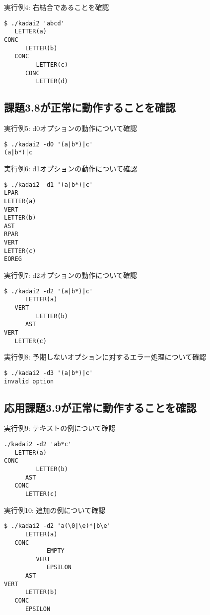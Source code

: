 \documentclass{jsarticle}
\theoremstyle{plain}
\begin{document}
実行例4: 右結合であることを確認
\begin{lstlisting}
$ ./kadai2 'abcd'
   LETTER(a)
CONC
      LETTER(b)
   CONC
         LETTER(c)
      CONC
         LETTER(d)
\end{lstlisting}


\subsection*{課題3.8が正常に動作することを確認}

実行例5: d0オプションの動作について確認
\begin{lstlisting}
$ ./kadai2 -d0 '(a|b*)|c'
(a|b*)|c
\end{lstlisting}

実行例6: d1オプションの動作について確認
\begin{lstlisting}
$ ./kadai2 -d1 '(a|b*)|c'
LPAR
LETTER(a)
VERT
LETTER(b)
AST
RPAR
VERT
LETTER(c)
EOREG
\end{lstlisting}

実行例7: d2オプションの動作について確認
\begin{lstlisting}
$ ./kadai2 -d2 '(a|b*)|c'
      LETTER(a)
   VERT
         LETTER(b)
      AST
VERT
   LETTER(c)
\end{lstlisting}

実行例8: 予期しないオプションに対するエラー処理について確認
\begin{lstlisting}
$ ./kadai2 -d3 '(a|b*)|c'
invalid option
\end{lstlisting}

\subsection*{応用課題3.9が正常に動作することを確認}


実行例9: テキストの例について確認
\begin{lstlisting}
./kadai2 -d2 'ab*c'
   LETTER(a)
CONC
         LETTER(b)
      AST
   CONC
      LETTER(c)
\end{lstlisting}

実行例10: 追加の例について確認
\begin{lstlisting}
$ ./kadai2 -d2 'a(\0|\e)*|b\e'
      LETTER(a)
   CONC
            EMPTY
         VERT
            EPSILON
      AST
VERT
      LETTER(b)
   CONC
      EPSILON
\end{lstlisting}
\end{document}
